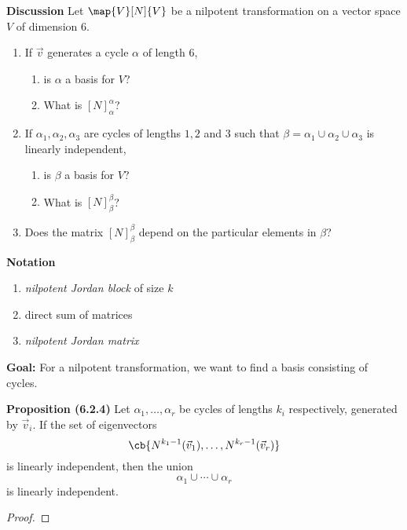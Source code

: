 \documentclass[letterpaper, 10pt]{article}
\begin{document}
\newpage
\lb
\textbf{Discussion}
\lb
Let $\map{V}[N]{V}$ be a nilpotent transformation on a vector space $V$ of dimension $6$.
\begin{enumerate}
    \item If $\vec v$ generates a cycle $α$ of length $6$,
        \begin{enumerate}
            \item is $α$ a basis for $V$?
            \item What is $[N]_α^α$?
        \end{enumerate}
    \item If $α_1, α_2, α_3$ are cycles of lengths $1, 2$ and $3$ such that
        $β = α_1 \cup α_2 \cup α_3$ is linearly independent,
        \begin{enumerate}
            \item is $β$ a basis for $V$?
            \item What is $[N]_β^β$?
        \end{enumerate}

    \item
        Does the matrix $[N]_β^β$ depend on the particular elements in $β$?
\end{enumerate}

\newpage
\lb
\textbf{Notation}
\lb
\begin{enumerate}
    \item \emph{nilpotent Jordan block} of size $k$
    \vspace{150pt}
    \item direct sum of matrices
    \vspace{150pt}
    \item \emph{nilpotent Jordan matrix}
\end{enumerate}



\vspace{150pt}
\lb
\textbf{Goal:} For a nilpotent transformation, we want to find a basis consisting of cycles.
\lb
{}


\newpage
\lb
\textbf{Proposition (6.2.4)}
\lb
Let $α_1, \ldots, α_r$ be cycles of lengths $k_i$ respectively, generated by $\vec v_i$.
If the set of eigenvectors
\[ \cb{N^{k_1 -1} (\vec v_1) , \ldots, N^{k_r -1} (\vec v_r)} \]
is linearly independent, then the union 
\[ α_1 \cup \cdots \cup α_r \]
is linearly independent.
\begin{proof}
\end{proof}
\end{document}
